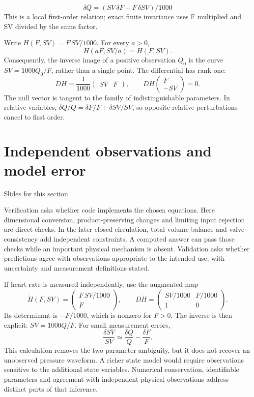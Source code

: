 \documentclass[11pt,letterpaper]{article}
\theoremstyle{definition}\newtheorem{definition}{Definition}\newtheorem{example}{Example}
\numberwithin{equation}{section}
\begin{document}
\[
\delta\overline Q=(SV\,\delta F+F\,\delta SV)/1000
\]
This is a local first-order relation; exact finite invariance uses F multiplied and SV divided by the same factor.

Write $H(F,SV)=F\,SV/1000$. For every $a>0$,
\[
 H(aF,SV/a)=H(F,SV).
\]
Consequently, the inverse image of a positive observation $Q_0$ is the curve $SV=1000Q_0/F$, rather than a single point. The differential has rank one:
\[
 DH=\frac1{1000}\begin{pmatrix}SV&F\end{pmatrix},
 \qquad DH\begin{pmatrix}F\\-SV\end{pmatrix}=0.
\]
The null vector is tangent to the family of indistinguishable parameters. In relative variables, $\delta Q/Q=\delta F/F+\delta SV/SV$, so opposite relative perturbations cancel to first order.
\section{Independent observations and model error}
\hypertarget{note-independent-observations-and-model-error}{}\label{note:independent-observations-and-model-error}
{\small \href{slides.html\#frame=adding-an-independent-measurement\&step=1}{Slides for this section}}\par
Verification asks whether code implements the chosen equations. Here dimensional conversion, product-preserving changes and limiting input rejection are direct checks. In the later closed circulation, total-volume balance and valve consistency add independent constraints. A computed answer can pass those checks while an important physical mechanism is absent. Validation asks whether predictions agree with observations appropriate to the intended use, with uncertainty and measurement definitions stated.

If heart rate is measured independently, use the augmented map
\[
 \widetilde H(F,SV)=\begin{pmatrix}F\,SV/1000\\F\end{pmatrix},
 \qquad
 D\widetilde H=\begin{pmatrix}SV/1000&F/1000\\1&0\end{pmatrix}.
\]
Its determinant is $-F/1000$, which is nonzero for $F>0$. The inverse is then explicit: $SV=1000Q/F$. For small measurement errors,
\[
 \frac{\delta SV}{SV}\simeq\frac{\delta Q}{Q}-\frac{\delta F}{F}.
\]
This calculation removes the two-parameter ambiguity, but it does not recover an unobserved pressure waveform. A richer state model would require observations sensitive to the additional state variables. Numerical conservation, identifiable parameters and agreement with independent physical observations address distinct parts of that inference.
\bigskip
\end{document}
